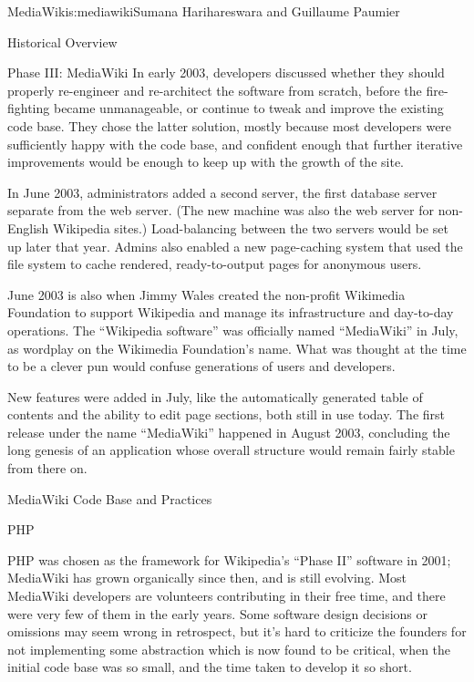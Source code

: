 \begin{aosachapter}{MediaWiki}{s:mediawiki}{Sumana Harihareswara and Guillaume Paumier}
\begin{aosasect1}{Historical Overview}
\begin{aosasect2}{Phase III: MediaWiki}
In early 2003, developers discussed whether they should properly
re-engineer and re-architect the software from scratch, before the
fire-fighting became unmanageable, or continue to tweak and improve
the existing code base. They chose the latter solution, mostly because
most developers were sufficiently happy with the code base, and
confident enough that further iterative improvements would be enough
to keep up with the growth of the site.

In June 2003, administrators added a second server, the first database
server separate from the web server. (The new machine was also the web
server for non-English Wikipedia sites.) Load-balancing between the
two servers would be set up later that year. Admins also enabled a new
page-caching system that used the file system to cache rendered,
ready-to-output pages for anonymous users.

June 2003 is also when Jimmy Wales created the non-profit Wikimedia 
Foundation
to support Wikipedia and manage its infrastructure and
day-to-day operations. The ``Wikipedia software'' was officially named
``MediaWiki'' in July, as wordplay on the Wikimedia Foundation's
name. What was thought at the time to be a clever pun would confuse
generations of users and developers.

New features were added in July, like the automatically generated
table of contents and the ability to edit page sections, both still
in use today. The first release under the name ``MediaWiki'' happened in
August 2003, concluding the long genesis of an application whose
overall structure would remain fairly stable from there on.

\end{aosasect2}

\end{aosasect1}

\begin{aosasect1}{MediaWiki Code Base and Practices}

\begin{aosasect2}{PHP}

PHP was chosen as the framework for Wikipedia's ``Phase II'' software in
2001; MediaWiki has grown organically since then, and is still
evolving. Most MediaWiki developers are volunteers contributing in
their free time, and there were very few of them in the early years. Some
software design decisions or omissions may seem wrong in retrospect,
but it's hard to criticize the founders for not implementing some
abstraction which is now found to be critical, when the initial code
base was so small, and the time taken to develop it so short.


\end{aosasect2}
\end{aosasect1}
\end{aosachapter}
